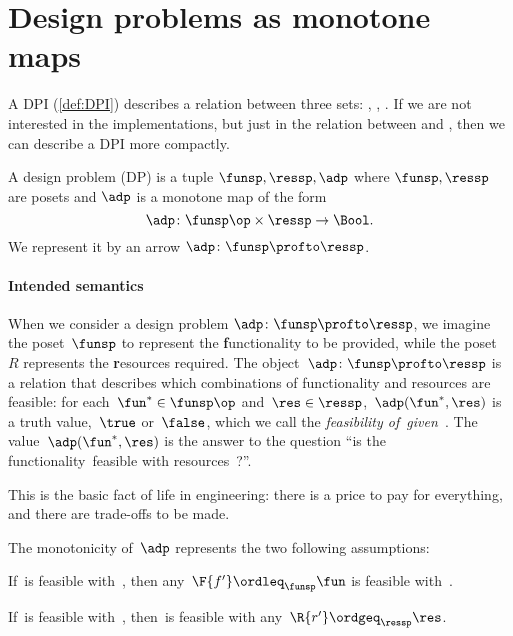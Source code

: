
\section{Design problems as monotone maps}
\label{sec:dpdefinition}

A DPI (\cref{def:DPI}) describes a relation between three sets: \funsp, \ressp, \impsp.
If we are not interested in the implementations, but just in the relation between
\funsp and \ressp, then we can describe a DPI more compactly.


\begin{definition}
  \label{def:design-problem}
  A design problem (DP) is a tuple $\funsp, \ressp, \adp$
  where $\funsp, \ressp$ are posets and $\adp$ is a monotone map of the form
  \begin{equation}
    \adp \colon  \funsp\op \times \ressp \to \Bool.
  \end{equation}
  We represent it by an arrow $\adp \colon \funsp \profto \ressp$.
\end{definition}

\paragraph{Intended semantics}
When we consider a design problem $\adp\colon \funsp \profto \ressp$, we imagine the poset~$\funsp$ to represent the \textbf{f}unctionality to be provided, while the poset~$R$ represents the \textbf{r}esources required. The object~$\adp \colon \funsp \profto \ressp$ is a relation that describes which combinations of functionality and resources are feasible: for each~$\fun^* \in \funsp\op$ and~$\res \in \ressp$,~$\adp(\fun^*,\res)$ is a truth value,~$\true$ or~$\false$, which we call the \emph{feasibility of~\fun given~\res}. The value~$\adp(\fun^*,\res)$ is the answer to the question ``is the functionality~\fun feasible with resources~\res?''.

This is the basic fact of life in engineering: there is a price to pay for everything, and there are trade-offs to be made.

The monotonicity of~$\adp$ represents the two following assumptions:

\begin{compactenum}
  \item If~\fun is feasible with~\res, then any~$\F{f'} \ordleq_\funsp \fun$ is feasible with~\res.
  \item If~\fun is feasible with~\res, then~\fun is feasible with any~$\R{r'} \ordgeq_\ressp \res$.
\end{compactenum}

